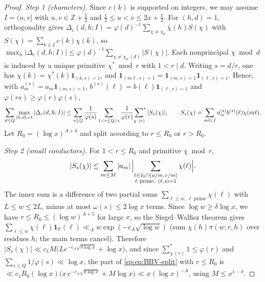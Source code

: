 \documentclass[final,11pt]{elsarticle}
\theoremstyle{definition}
\theoremstyle{remark}
\newcommand{\PP}{\mathbb{P}}
\newcommand{\one}{\mathbf1}
\numberwithin{equation}{section}
\begin{document}
\begin{proof}
\emph{Step 1 (characters).} Since $c(k)$ is supported on integers, we may
assume $I=(u,v]$ with $u,v\in\mathbb Z+\tfrac12$ and $\tfrac12\le u<v\le2x+\tfrac12$.
For $(h,d)=1$, orthogonality gives
$\Delta_c(d,h;I)=\varphi(d)^{-1}\sum_{\chi\ne\chi_0}\bar\chi(h)S(\chi)$ with
$S(\chi)=\sum_{k\in I}c(k)\chi(k)$, so
$\max_h|\Delta_c(d,h;I)|\le\varphi(d)^{-1}\sum_{\chi\ne\chi_0\,(d)}|S(\chi)|$.
Each nonprincipal $\chi\bmod d$ is induced by a unique primitive $\chi^*\bmod r$
with $1<r\mid d$. Writing $s=d/r$, one has $\chi(k)=\chi^*(k)\one_{(k,s)=1}$, and
$\one_{(m\ell,s)=1}=\one_{(m,s)=1}\one_{(\ell,s)=1}$. Hence, with
$a^{(s)}_m=a_m\one_{(m,s)=1}$, $b^{(s)}(\ell)=b(\ell)\one_{(\ell,s)=1}$ and
$\varphi(rs)\ge\varphi(r)\varphi(s)$,
\begin{equation}\label{sp:eq:BBV-split}
 \sum_{d\le Q}\max_{(h,d)=1}|\Delta_c(d,h;I)|
 \le\sum_{s\le Q}\frac1{\varphi(s)}\sum_{1<r\le Q/s}\frac1{\varphi(r)}
 \sideset{}{^*}\sum_{\chi\ (r)}|S_s(\chi)|,\qquad
 S_s(\chi)=\sum_{m\ell\in I}a^{(s)}_mb^{(s)}(\ell)\chi(m\ell).
\end{equation}
Let $R_0=(\log x)^{A+4}$ and split according to $r\le R_0$ or $r>R_0$.

\emph{Step 2 (small conductors).} For $1<r\le R_0$ and primitive $\chi\bmod r$,
\[
 |S_s(\chi)|\le\sum_{m\le M}|a_m|\,\Bigl|\sum_{\substack{\ell\in I_0\cap(u/m,v/m]\\ \ell\ \mathrm{prime},\ (\ell,s)=1}}\chi(\ell)\Bigr|.
\]
The inner sum is a difference of two partial sums
$\sum_{\ell\le w,\ \ell\ \mathrm{prime}}\chi(\ell)$ with $L\le w\le2L$, minus at
most $\omega(s)\le2\log x$ terms. Since $\log w\ge\delta\log x$, we have
$r\le R_0\le(\log w)^{A+5}$ for large $x$, so the Siegel--Walfisz theorem
\cite[Ch.~22]{Davenport} gives
$\sum_{\ell\le w}\chi(\ell)\one_\PP(\ell)\ll_A w\exp(-c_A\sqrt{\log w})$
(sum $\chi(h)\pi(w;r,h)$ over residues $h$; the main terms cancel). Therefore
$|S_s(\chi)|\ll c_1M\bigl(L e^{-c_A\sqrt{\delta\log x}}+\log x\bigr)$, and since
$\sum^*_{\chi\,(r)}1\le\varphi(r)$ and $\sum_{s\le Q}1/\varphi(s)\ll\log x$,
the part of \eqref{sp:eq:BBV-split} with $r\le R_0$ is
$\ll c_1R_0(\log x)\bigl(x\,e^{-c_A\sqrt{\delta\log x}}+M\log x\bigr)\ll x(\log x)^{-A}$,
using $M\le x^{1-\delta}$.


\end{proof}
\end{document}
